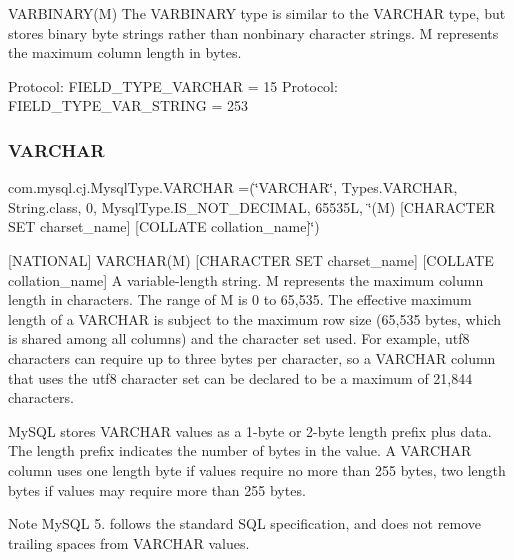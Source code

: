 V\+A\+R\+B\+I\+N\+A\+R\+Y(\+M) The V\+A\+R\+B\+I\+N\+A\+RY type is similar to the V\+A\+R\+C\+H\+AR type, but stores binary byte strings rather than nonbinary character strings. M represents the maximum column length in bytes.

Protocol\+: F\+I\+E\+L\+D\+\_\+\+T\+Y\+P\+E\+\_\+\+V\+A\+R\+C\+H\+AR = 15 Protocol\+: F\+I\+E\+L\+D\+\_\+\+T\+Y\+P\+E\+\_\+\+V\+A\+R\+\_\+\+S\+T\+R\+I\+NG = 253 \mbox{\label{enumcom_1_1mysql_1_1cj_1_1_mysql_type_a46a41a74f7598b207cfc15b8fdf3cd34}} 
\subsubsection{\texorpdfstring{V\+A\+R\+C\+H\+AR}{VARCHAR}}
{\footnotesize\ttfamily com.\+mysql.\+cj.\+Mysql\+Type.\+V\+A\+R\+C\+H\+AR =(\char`\"{}V\+A\+R\+C\+H\+AR\char`\"{}, Types.\+V\+A\+R\+C\+H\+AR, String.\+class, 0, Mysql\+Type.\+I\+S\+\_\+\+N\+O\+T\+\_\+\+D\+E\+C\+I\+M\+AL, 65535\+L, \char`\"{}(\+M) \mbox{[}\+C\+H\+A\+R\+A\+C\+T\+E\+R S\+E\+T charset\+\_\+name\mbox{]} \mbox{[}\+C\+O\+L\+L\+A\+T\+E collation\+\_\+name\mbox{]}\char`\"{})}

\mbox{[}N\+A\+T\+I\+O\+N\+AL\mbox{]} V\+A\+R\+C\+H\+A\+R(\+M) \mbox{[}C\+H\+A\+R\+A\+C\+T\+ER S\+ET charset\+\_\+name\mbox{]} \mbox{[}C\+O\+L\+L\+A\+TE collation\+\_\+name\mbox{]} A variable-\/length string. M represents the maximum column length in characters. The range of M is 0 to 65,535. The effective maximum length of a V\+A\+R\+C\+H\+AR is subject to the maximum row size (65,535 bytes, which is shared among all columns) and the character set used. For example, utf8 characters can require up to three bytes per character, so a V\+A\+R\+C\+H\+AR column that uses the utf8 character set can be declared to be a maximum of 21,844 characters.

My\+S\+QL stores V\+A\+R\+C\+H\+AR values as a 1-\/byte or 2-\/byte length prefix plus data. The length prefix indicates the number of bytes in the value. A V\+A\+R\+C\+H\+AR column uses one length byte if values require no more than 255 bytes, two length bytes if values may require more than 255 bytes.

Note My\+S\+QL 5. follows the standard S\+QL specification, and does not remove trailing spaces from V\+A\+R\+C\+H\+AR values.

